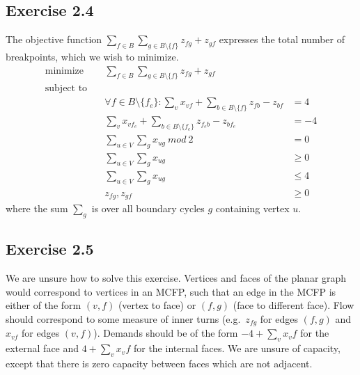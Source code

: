 \subsection{Exercise 2.4}
%
The objective function $\sum_{f\in B} \sum_{g\in B\setminus\{f\}} z_{fg} +
z_{gf}$ expresses the total number of breakpoints, which we wish to minimize.
\begin{align*}
  \text{minimize} \quad & \sum_{f\in B} \sum_{g\in B\setminus\{f\}} z_{fg} + z_{gf} &  \\
  \text{subject to} \quad & & \\
  & \forall f \in B\setminus \{f_e\} : \sum_{v} x_{vf} + \sum_{b\in B\setminus \{f\}} z_{fb} - z_{bf} &= 4 \\
  & \sum_{v} x_{v f_e} + \sum_{b\in B\setminus \{f_e\}} z_{f_e b} - z_{b f_e} &= -4 \\
  & \sum_{u\in V} \sum_{g} x_{ug} \ \textit{mod} \ 2 & = 0 \\
  & \sum_{u\in V} \sum_{g} x_{ug} & \geq 0 \\
  & \sum_{u\in V} \sum_{g} x_{ug} & \leq 4 \\
  & z_{fg}, z_{gf} & \geq 0
\end{align*} 
%
where the sum $\sum_{g}$ is over all boundary cycles $g$ containing vertex $u$.
%
\subsection{Exercise 2.5}
%
We are unsure how to solve this exercise. Vertices and faces of the planar graph
would correspond to vertices in an MCFP, such that an edge in the MCFP is either 
of the form $(v,f)$ (vertex to face) or $(f,g)$ (face to different face). Flow should 
correspond to some measure of inner turns (e.g.\ $z_{fg}$ for edges $(f,g)$ and $x_{vf}$ 
for edges $(v,f)$). Demands should be of the form
$-4+\sum_{v} x_vf$ for the external face and $4+\sum_{v} x_vf$ for the internal faces.
We are unsure of capacity, except that there is zero capacity between faces which are not
adjacent.